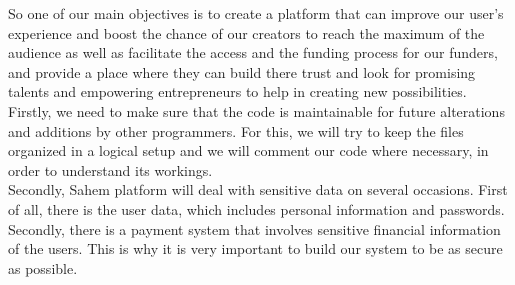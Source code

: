 So one of our main objectives is to create a platform that can improve our user's experience and boost the chance of our creators to reach the maximum of the audience as well as facilitate the access and the funding process for our funders, and provide a place where they can build there trust and look for promising talents and empowering entrepreneurs to help in creating new possibilities.\\

Firstly, we need to make sure
that the code is maintainable for future alterations and additions by other programmers. For this, we will try
to keep the files organized in a logical setup and we will comment our code where necessary, in order to understand
its workings.\\

Secondly, Sahem platform will deal with sensitive data on several occasions. First of all, there
is the user data, which includes personal information and passwords. Secondly, there is a payment system
that involves sensitive financial information of the users. This is why it is very important to build our system
to be as secure as possible.\\

